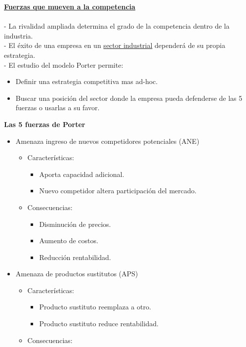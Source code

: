 \documentclass{templateNote}
\begin{document}
\noindent\underline{\textbf{Fuerzas que mueven a la competencia}}\\\\
- La rivalidad ampliada determina el grado de la competencia dentro de la industria.\\
- El éxito de una empresa en un \hyperlink{sec_ind}{sector industrial} dependerá de su propia estrategia. \\
- El estudio del modelo Porter permite:
\begin{itemize}
    \item Definir una estrategia competitiva mas ad-hoc.
    \item Buscar una posición del sector donde la empresa pueda defenderse de las 5 fuerzas o usarlas a su favor.
\end{itemize} 
\textbf{Las 5 fuerzas de Porter}
    \begin{itemize}
        \item Amenaza ingreso de nuevos competidores potenciales (ANE)
        \begin{itemize}
            \item Características:
            \begin{itemize}
                \item Aporta capacidad adicional.
                \item Nuevo competidor altera participación del mercado.
            \end{itemize}
            \item Consecuencias:
            \begin{itemize}
                \item Disminución de precios.
                \item Aumento de costos.
                \item Reducción rentabilidad.
            \end{itemize}
        \end{itemize}
        \item Amenaza de productos sustitutos (APS)
        \begin{itemize}
            \item Características:
            \begin{itemize}
                \item Producto sustituto reemplaza a otro.
                \item Producto sustituto reduce rentabilidad.
            \end{itemize}
            \item Consecuencias:

\end{itemize}
\end{itemize}
\end{document}
